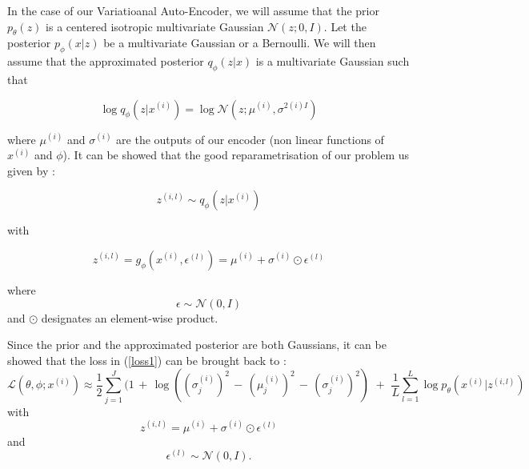 \documentclass{article}
\begin{document}
In the case of our Variatioanal Auto-Encoder, we will assume that the prior $p_\theta (z)$ is a centered isotropic multivariate Gaussian $\mathcal{N}(z;0,I)$. Let the posterior $p_\phi (x | z)$ be a multivariate Gaussian or a Bernoulli. We will then assume that the approximated posterior $q_\phi (z|x)$ is a multivariate Gaussian such that


\begin{center}
    \begin{equation*}
        \log q_\phi(z|x^{(i)}) = \log \mathcal{N} (z; \mu^{(i)}, \sigma^{2(i)I})  
    \end{equation*}
\end{center}


where $\mu^{(i)}$ and $\sigma^{(i)}$ are the outputs of our encoder (non linear functions of $x^{(i)}$ and $\phi$). It can be showed that the good reparametrisation of our problem us given by :

\begin{center}
    \begin{equation*}
        z^{(i,l)} \sim q_\phi (z|x^{(i)})
    \end{equation*}
\end{center}
with 

\begin{center}
    \begin{equation*}
        z^{(i,l)} = g_\phi (x^{(i)}, \epsilon^{(l)}) = \mu^{(i)} + \sigma^{(i)}  \odot\epsilon^{(l)}
\end{equation*}
\end{center}
where 
\begin{equation*}
    \epsilon \sim \mathcal{N}(0,I)
\end{equation*}
and $\odot$ designates an element-wise product.

Since the prior and the approximated posterior are both Gaussians, it can be showed that the loss in (\ref{loss1}) can be brought back to :
\begin{equation}\label{loss2}
    \mathcal{L}(\theta, \phi; x^{(i)}) \approx \frac{1}{2} \sum_{j=1}^{J} (1 \,+\, \log((\sigma_j^{(i)})^2 \,-\, (\mu_j^{(i)})^2 \,-\,(\sigma_j^{(i)})^2)\,\,+\,\,\frac{1}{L}\sum_{l=1}^{L} \log p_\theta(x^{(i)} | z^{(i,l)})
\end{equation}
with
\begin{equation*}
    z^{(i,l)}=\mu^{(i)} + \sigma^{(i)} \odot \epsilon^{(l)}
\end{equation*}
and 
\begin{equation*}
    \epsilon^{(l)} \sim \mathcal{N}(0,I).
\end{equation*}
\end{document}
